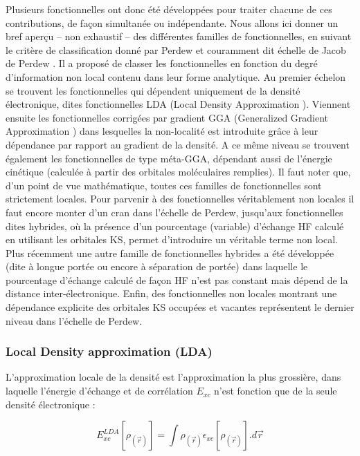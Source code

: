 Plusieurs fonctionnelles ont donc été développées pour traiter chacune de ces contributions, de façon simultanée ou indépendante. Nous allons ici donner un bref aperçu -- non exhaustif -- des différentes familles de fonctionnelles, en suivant le critère de classification donné par Perdew et couramment dit \og échelle de Jacob de Perdew \fg{}. Il a proposé de classer les fonctionnelles en fonction du degré d’information non local contenu dans leur forme analytique. Au premier échelon se trouvent les fonctionnelles qui dépendent uniquement de la densité électronique, dites fonctionnelles LDA (\og Local Density Approximation \fg{}). Viennent ensuite les fonctionnelles corrigées par gradient GGA (\og Generalized Gradient Approximation \fg{}) dans lesquelles la non-localité est introduite grâce à leur dépendance par rapport au gradient de la densité. A ce même niveau se trouvent également les fonctionnelles de type méta-GGA, dépendant aussi de l’énergie cinétique (calculée à partir des orbitales moléculaires remplies). Il faut noter que, d’un point de vue mathématique, toutes ces familles de fonctionnelles sont strictement locales. Pour parvenir à des fonctionnelles véritablement non locales il faut encore monter d’un cran dans l’échelle de Perdew, jusqu’aux fonctionnelles dites hybrides, où la présence d’un pourcentage (variable) d’échange HF calculé en utilisant les orbitales KS, permet d’introduire un véritable terme non local. Plus récemment une autre famille de fonctionnelles hybrides a été développée (dite à longue portée ou encore à séparation de portée) dans laquelle le pourcentage d’échange calculé de façon HF n’est pas constant mais dépend de la distance inter-électronique. Enfin, des fonctionnelles non locales montrant une dépendance explicite des orbitales KS occupées et vacantes représentent le dernier niveau dans l’échelle de Perdew.

\subsubsection{Local Density approximation (LDA)}\label{lda}

L’approximation locale de la densité est l’approximation la plus grossière, dans laquelle l’énergie d’échange et de corrélation $E_{xc}$ n’est fonction que de la seule densité électronique :

\begin{equation}
E_{xc}^{LDA}[\rho_{(\vec{r})}] = \int \rho_{(\vec{r})} \epsilon_{xc}[\rho_{(\vec{r})}].d\vec{r}
\end{equation}

